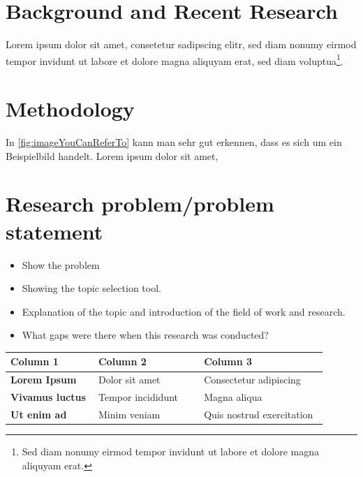 \section{Background and Recent Research}


Lorem ipsum dolor sit amet, consetetur sadipscing elitr, sed diam nonumy eirmod tempor invidunt ut labore et dolore magna aliquyam erat, sed diam voluptua\footnote{Sed diam nonumy eirmod tempor invidunt ut labore et dolore magna aliquyam erat.}. 


\section{Methodology}

In \autoref{fig:imageYouCanReferTo} kann man sehr gut erkennen, dass es sich um ein Beispielbild handelt. Lorem ipsum dolor sit amet, 





\section{Research problem/problem statement}
\begin{itemize}
	\item Show the problem
	\item Showing the topic selection tool.
	\item Explanation of the topic and introduction of the field of work and research.
	\item What gaps were there when this research was conducted?
\end{itemize}

\begin{table}[h]
	\begin{tabular}{|>{\bfseries}p{0.25\linewidth} | p{0.30\linewidth} | p{0.35\linewidth}|}
		\hline
		Column 1 &  \textbf{Column 2} &  \textbf{Column 3}\\ 
		\hline
		Lorem Ipsum   & Dolor sit amet    & Consectetur adipiscing\\ 
		\hline
		Vivamus luctus& Tempor incididunt & Magna aliqua\\ 
		\hline
		Ut enim ad    & Minim veniam      & Quis nostrud exercitation\\ 
		\hline
	\end{tabular}
	\label{tab:1-1}
\end{table}
